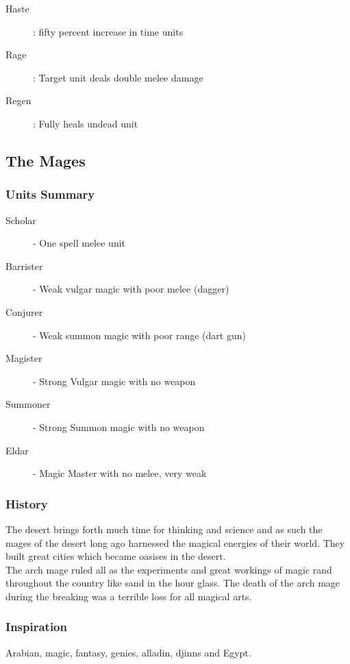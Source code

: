 \documentclass[a4paper]{article}
\begin{document}
\begin{description}
\item[Haste]: fifty percent increase in time units
\item[Rage]: Target unit deals double melee damage
\item[Regen]: Fully heals undead unit
\end{description}

\subsection{The Mages}

\subsubsection{Units Summary}

\begin{description}
\item[Scholar] -  One spell melee unit
\item[Barrister] - Weak vulgar magic with poor melee (dagger)
\item[Conjurer] - Weak summon magic with poor range (dart gun)
\item[Magister] - Strong Vulgar magic with no weapon
\item[Summoner] - Strong Summon magic with no weapon
\item[Eldar] - Magic Master with no melee, very weak
\end{description}

\subsubsection{History}
The desert brings forth much time for thinking and science and as such the mages of the desert long ago harnessed the magical energies of their world. They built great cities which became oasises in the desert.\\
The arch mage ruled all as the experiments and great workings of magic rand throughout the country like sand in the hour glass. The death of the arch mage during the breaking was a terrible loss for all magical arts.\\

\subsubsection{Inspiration}
Arabian, magic, fantasy, genies, alladin, djinns and Egypt.
\end{document}
